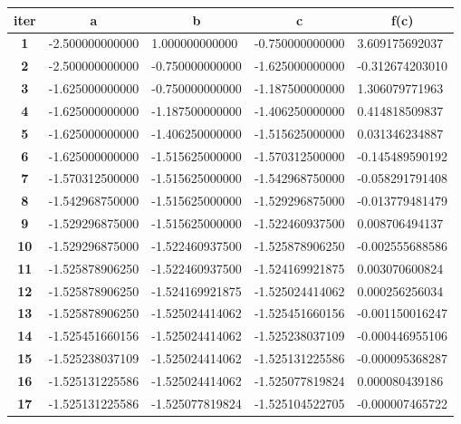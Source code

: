 \documentclass[a4paper, 12pt]{report}
\begin{document}
\begin{table}[h]
\begin{tabular}{|c|l|l|l|l|}
\hline
\textbf{iter} & \multicolumn{1}{c|}{\textbf{a}} & \multicolumn{1}{c|}{\textbf{b}} & \multicolumn{1}{c|}{\textbf{c}} & \multicolumn{1}{c|}{\textbf{f(c)}} \\ \hline
\textbf{1}  & -2.500000000000 & 1.000000000000  & -0.750000000000 & 3.609175692037  \\ \hline
\textbf{2}  & -2.500000000000 & -0.750000000000 & -1.625000000000 & -0.312674203010 \\ \hline
\textbf{3}  & -1.625000000000 & -0.750000000000 & -1.187500000000 & 1.306079771963  \\ \hline
\textbf{4}  & -1.625000000000 & -1.187500000000 & -1.406250000000 & 0.414818509837  \\ \hline
\textbf{5}  & -1.625000000000 & -1.406250000000 & -1.515625000000 & 0.031346234887  \\ \hline
\textbf{6}  & -1.625000000000 & -1.515625000000 & -1.570312500000 & -0.145489590192 \\ \hline
\textbf{7}  & -1.570312500000 & -1.515625000000 & -1.542968750000 & -0.058291791408 \\ \hline
\textbf{8}  & -1.542968750000 & -1.515625000000 & -1.529296875000 & -0.013779481479 \\ \hline
\textbf{9}  & -1.529296875000 & -1.515625000000 & -1.522460937500 & 0.008706494137  \\ \hline
\textbf{10} & -1.529296875000 & -1.522460937500 & -1.525878906250 & -0.002555688586 \\ \hline
\textbf{11} & -1.525878906250 & -1.522460937500 & -1.524169921875 & 0.003070600824  \\ \hline
\textbf{12} & -1.525878906250 & -1.524169921875 & -1.525024414062 & 0.000256256034  \\ \hline
\textbf{13} & -1.525878906250 & -1.525024414062 & -1.525451660156 & -0.001150016247 \\ \hline
\textbf{14} & -1.525451660156 & -1.525024414062 & -1.525238037109 & -0.000446955106 \\ \hline
\textbf{15} & -1.525238037109 & -1.525024414062 & -1.525131225586 & -0.000095368287 \\ \hline
\textbf{16} & -1.525131225586 & -1.525024414062 & -1.525077819824 & 0.000080439186  \\ \hline
\textbf{17} & -1.525131225586 & -1.525077819824 & -1.525104522705 & -0.000007465722 \\ \hline

\end{tabular}
\end{table}
\end{document}
